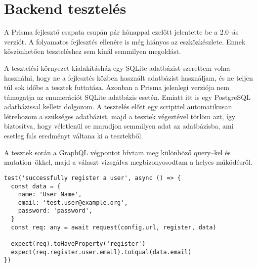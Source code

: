 
\section{Backend tesztelés}
A Prisma fejlesztő csapata csupán pár hónappal ezelőtt jelentette be a 2.0–ás verziót.
A folyamatos fejlesztés ellenére is még hiányos az eszközkészlete.
Ennek köszönhetően teszteléshez sem kínál semmilyen megoldást.

A tesztelési környezet kialakításház egy SQLite adatbázist szerettem volna használni, hogy ne a fejlesztés közben használt adatbázist használjam, és ne teljen túl sok időbe a tesztek futtatása.
Azonban a Prisma jelenlegi verziója nem támogatja az enumerációt SQLite adatbázis esetén.
Emiatt itt is egy PostgreSQL adatbázissal kellett dolgozom.
A tesztelés előtt egy scripttel automatikusan létrehozom a szükséges adatbázist, majd a tesztek végeztével törlöm azt, így biztosítva, hogy véletlenül se maradjon semmilyen adat az adatbázisba, ami esetleg fals eredményt váltana ki a tesztekből.

A tesztek során a GraphQL végpontot hívtam meg különböző query–kel és mutation–ökkel, majd a választ vizsgálva megbizonyosodtam a helyes működésről.


\begin{lstlisting}[style=ES6]    
test('successfully register a user', async () => {
  const data = {
    name: 'User Name',
    email: 'test.user@example.org',
    password: 'password',
  }
  const req: any = await request(config.url, register, data)

  expect(req).toHaveProperty('register')
  expect(req.register.user.email).toEqual(data.email)
})
\end{lstlisting}
